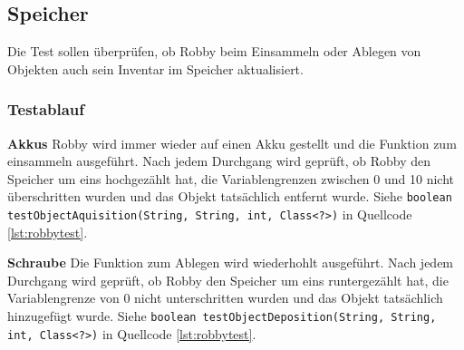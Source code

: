 \subsection{Speicher}
Die Test sollen überprüfen, ob Robby beim Einsammeln oder Ablegen von Objekten auch sein Inventar im Speicher aktualisiert.

\subsubsection*{Testablauf}
\textbf{Akkus} Robby wird immer wieder auf einen Akku gestellt und die Funktion zum einsammeln ausgeführt. Nach jedem Durchgang wird geprüft, ob Robby den Speicher um eins hochgezählt hat, die Variablengrenzen zwischen 0 und 10 nicht überschritten wurden und das Objekt tatsächlich entfernt wurde. Siehe \texttt{boolean testObjectAquisition(String, String, int, Class<?>)} in Quellcode \ref{lst:robbytest}.

\textbf{Schraube} Die Funktion zum Ablegen wird wiederhohlt ausgeführt. Nach jedem Durchgang wird geprüft, ob Robby den Speicher um eins runtergezählt hat, die Variablengrenze von 0 nicht unterschritten wurden und das Objekt tatsächlich hinzugefügt wurde. Siehe \texttt{boolean testObjectDeposition(String, String, int, Class<?>)} in Quellcode \ref{lst:robbytest}.

